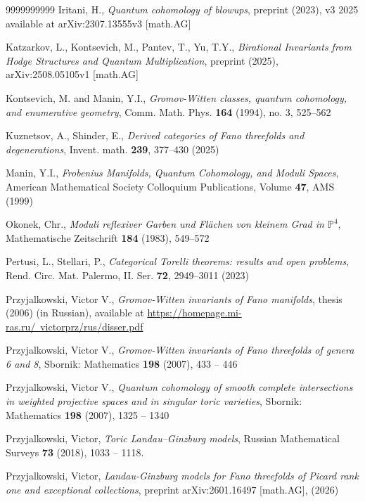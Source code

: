 \documentclass[11pt]{amsart}
\theoremstyle{plain}
\numberwithin{equation}{section}
\theoremstyle{definition}
\theoremstyle{remark}
\renewcommand{\P}{\mathbb P}
\begin{document}
\begin{thebibliography}{9999999999}
Iritani, H., \emph{Quantum cohomology of blowups}, preprint (2023), v3 2025 available at arXiv:2307.13555v3 [math.AG] 

Katzarkov, L., Kontsevich, M., Pantev, T., Yu, T.Y.,  \emph{Birational Invariants from Hodge Structures and Quantum Multiplication}, preprint (2025),  arXiv:2508.05105v1 [math.AG]

Kontsevich, M. and Manin, Y.I., \emph{Gromov-Witten classes, quantum cohomology, and enumerative geometry}, Comm. Math. Phys. \textbf{164} (1994), no. 3, 525--562

Kuznetsov, A., Shinder, E., \emph{Derived categories of Fano threefolds and degenerations}, Invent. math. \textbf{239},
377--430 (2025)

Manin, Y.I., \emph{Frobenius Manifolds, Quantum Cohomology, and Moduli Spaces}, American Mathematical Society Colloquium Publications, Volume \textbf{47}, AMS (1999)

Okonek, Chr., \emph{Moduli reflexiver Garben und Fl\"achen von kleinem Grad in $\P^4$},  Mathematische Zeitschrift \textbf{184} (1983),  549--572

Pertusi, L., Stellari, P.,  \emph{Categorical Torelli theorems: results and open problems}, Rend. Circ. Mat. Palermo, II. Ser.  \textbf{72}, 2949--3011 (2023)

Przyjalkowski, Victor V., \emph{Gromov-Witten invariants of Fano manifolds}, thesis (2006) (in Russian), available at \href{https://homepage.mi-ras.ru/~victorprz/rus/disser.pdf}{https://homepage.mi-ras.ru/~victorprz/rus/disser.pdf}

Przyjalkowski, Victor V., \emph{Gromov-Witten invariants of Fano threefolds of genera 6 and 8},  Sbornik: Mathematics \textbf{198}  (2007), 433 -- 446

Przyjalkowski, Victor V.,  \emph{Quantum cohomology of smooth complete intersections in weighted projective spaces and in singular toric varieties}, Sbornik: Mathematics \textbf{198} (2007), 1325 -- 1340

Przyjalkowski, Victor, \emph{Toric Landau–Ginzburg models}, Russian Mathematical Surveys \textbf{73}  (2018), 1033 -- 1118.

Przyjalkowski, Victor, \emph{Landau-Ginzburg models for Fano threefolds of Picard rank one and exceptional collections}, preprint arXiv:2601.16497 [math.AG], (2026)

\end{thebibliography}
\end{document}
